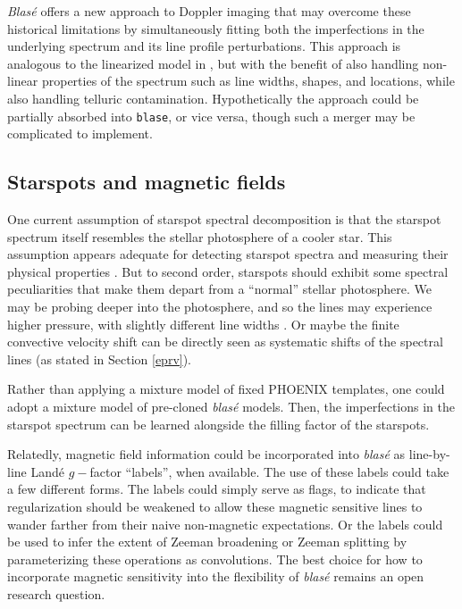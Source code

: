 \documentclass[twocolumn]{aastex631}
\begin{document}
\emph{Blas\'e} offers a new approach to Doppler imaging that may overcome these historical limitations by simultaneously fitting both the imperfections in the underlying spectrum and its line profile perturbations.  This approach is analogous to the linearized model in \citet{2021arXiv211006271L}, but with the benefit of also handling non-linear properties of the spectrum such as line widths, shapes, and locations, while also handling telluric contamination.  Hypothetically the \citet{2021arXiv211006271L} approach could be partially absorbed into \texttt{blase}, or vice versa, though such a merger may be complicated to implement.


\subsection{Starspots and magnetic fields}
One current assumption of starspot spectral decomposition is that the starspot spectrum itself resembles the stellar photosphere of a cooler star.  This assumption appears adequate for detecting starspot spectra and measuring their physical properties \citep{2017ApJ...836..200G}.  But to second order, starspots should exhibit some spectral peculiarities that make them depart from a ``normal'' stellar photosphere.  We may be probing deeper into the photosphere, and so the lines may experience higher pressure, with slightly different line widths \citep{oneal96}.  Or maybe the finite convective velocity shift can be directly seen as systematic shifts of the spectral lines (as stated in Section \ref{eprv}).

Rather than applying a mixture model of fixed PHOENIX templates, one could adopt a mixture model of pre-cloned  \emph{blas\'e} models.  Then, the imperfections in the starspot spectrum can be learned alongside the filling factor of the starspots.

Relatedly, magnetic field information could be incorporated into \emph{blas\'e} as line-by-line Land\'e $g-$factor ``labels'', when available. The use of these labels could take a few different forms. The labels could simply serve as flags, to indicate that regularization should be weakened to allow these magnetic sensitive lines to wander farther from their naive non-magnetic expectations.  Or the labels could be used to infer the extent of Zeeman broadening or Zeeman splitting by parameterizing these operations as convolutions.  The best choice for how to incorporate magnetic sensitivity into the flexibility of \emph{blas\'e} remains an open research question.
\end{document}
